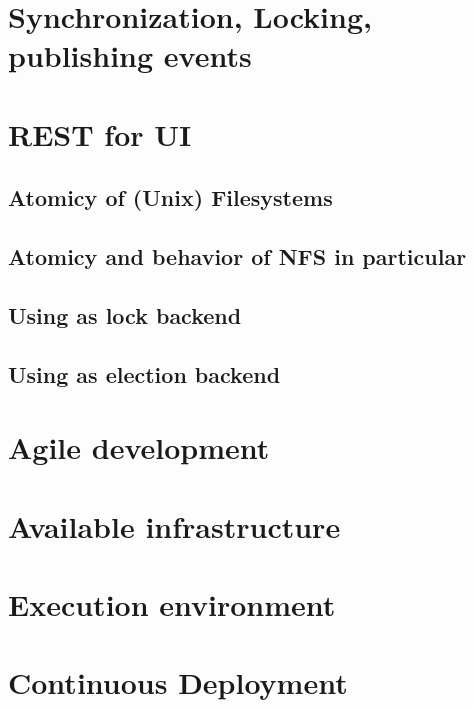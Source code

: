 \section{Synchronization, Locking, publishing events}

\section{REST for UI}



\subsection{Atomicy of (Unix) Filesystems}

\subsection{Atomicy and behavior of NFS in particular}

\subsection{Using as lock backend}

\subsection{Using as election backend}




\section{Agile development}

\section{Available infrastructure}

\section{Execution environment}

\section{Continuous Deployment}